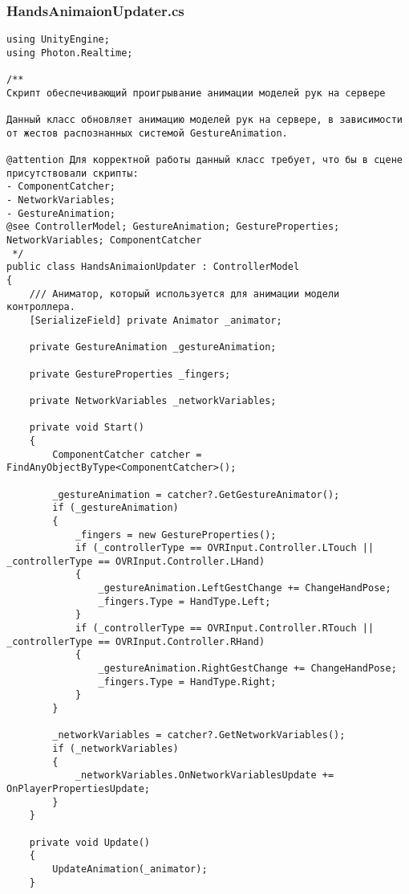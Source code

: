 \subsubsection*{HandsAnimaionUpdater.cs}
\begin{verbatim}
﻿using UnityEngine;
using Photon.Realtime;

/**
Скрипт обеспечивающий проигрывание анимации моделей рук на сервере

Данный класс обновляет анимацию моделей рук на сервере, в зависимости от жестов распознанных системой GestureAnimation.

@attention Для корректной работы данный класс требует, что бы в сцене присутствовали скрипты:
- ComponentCatcher;
- NetworkVariables;
- GestureAnimation;
@see ControllerModel; GestureAnimation; GestureProperties; NetworkVariables; ComponentCatcher
 */
public class HandsAnimaionUpdater : ControllerModel
{
    /// Аниматор, который используется для анимации модели контроллера.
    [SerializeField] private Animator _animator;

    private GestureAnimation _gestureAnimation;

    private GestureProperties _fingers;

    private NetworkVariables _networkVariables;

    private void Start()
    {
        ComponentCatcher catcher = FindAnyObjectByType<ComponentCatcher>();

        _gestureAnimation = catcher?.GetGestureAnimator();
        if (_gestureAnimation)
        {
            _fingers = new GestureProperties();
            if (_controllerType == OVRInput.Controller.LTouch || _controllerType == OVRInput.Controller.LHand)
            {
                _gestureAnimation.LeftGestChange += ChangeHandPose;
                _fingers.Type = HandType.Left;
            }
            if (_controllerType == OVRInput.Controller.RTouch || _controllerType == OVRInput.Controller.RHand)
            {
                _gestureAnimation.RightGestChange += ChangeHandPose;
                _fingers.Type = HandType.Right;
            }
        }

        _networkVariables = catcher?.GetNetworkVariables();
        if (_networkVariables)
        {
            _networkVariables.OnNetworkVariablesUpdate += OnPlayerPropertiesUpdate;
        }
    }

    private void Update()
    {
        UpdateAnimation(_animator);
    }


\end{verbatim}
